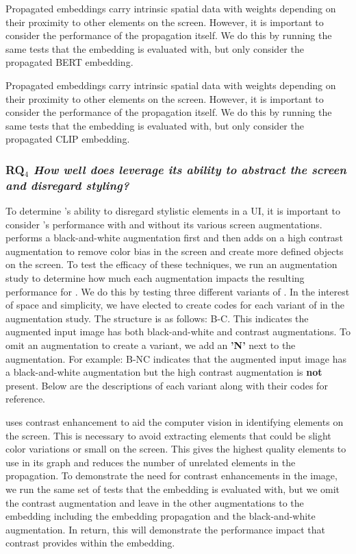 
Propagated embeddings carry intrinsic spatial data with weights depending on their proximity to other elements on the screen. However, it is important to consider the performance of the propagation itself. We do this by running the same tests that the \FRAME embedding is evaluated with, but only consider the propagated BERT embedding. 


Propagated embeddings carry intrinsic spatial data with weights depending on their proximity to other elements on the screen. However, it is important to consider the performance of the propagation itself. We do this by running the same tests that the \FRAME embedding is evaluated with, but only consider the propagated CLIP embedding. 

\subsubsection{\textbf{RQ$_4$} \textit{How well does \FRAME leverage its ability to abstract the screen and disregard styling?}}

To determine \FRAME's ability to disregard stylistic elements in a UI, it is important to consider \FRAME's performance with and without its various screen augmentations. \FRAME performs a black-and-white augmentation first and then adds on a high contrast augmentation to remove color bias in the screen and create more defined objects on the screen. To test the efficacy of these techniques, we run an augmentation study to determine how much each augmentation impacts the resulting performance for \FRAME. We do this by testing three different variants of \FRAME. In the interest of space and simplicity, we have elected to create codes for each variant of \FRAME in the augmentation study. The structure is as follows: B-C. This indicates the augmented input image has both black-and-white and contrast augmentations. To omit an augmentation to create a variant, we add an \textbf{'N'} next to the augmentation. For example: B-NC indicates that the augmented input image has a black-and-white augmentation but the high contrast augmentation is \textbf{not} present. Below are the descriptions of each variant along with their codes for reference.


\FRAME uses contrast enhancement to aid the computer vision in identifying elements on the screen. This is necessary to avoid extracting elements that could be slight color variations or small on the screen. This gives \FRAME the highest quality elements to use in its graph and reduces the number of unrelated elements in the propagation. To demonstrate the need for contrast enhancements in the image, we run the same set of tests that the \FRAME embedding is evaluated with, but we omit the contrast augmentation and leave in the other augmentations to the embedding including the embedding propagation and the black-and-white augmentation. In return, this will demonstrate the performance impact that contrast provides within the \FRAME embedding. 

